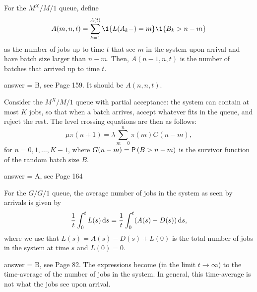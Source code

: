 \begin{exercise}[201803]
For the $M^X/M/1$ queue, define 
\begin{equation*}
  A(m,n,t) = \sum_{k=1}^{A(t)}\1{L(A_k-) = m}\1{B_k > n-m}
\end{equation*}
as the number of jobs up to time $t$ that see $m$ in the system upon
arrival and have batch size larger than $n-m$.  Then, $A(n-1, n, t)$ is the number of batches that arrived up to time $t$. 
\begin{solution}
answer = B, see Page 159. It should be $A(n, n,t)$.
\end{solution}
\end{exercise}

\begin{exercise}[201803]
Consider the $M^X/M/1$ queue with partial acceptance: the system can contain at most $K$ jobs, so that when a batch arrives,  accept whatever fits in the queue, and reject the rest.
The level crossing equations are then as follows:
  \begin{equation*}
    \mu \pi(n+1) = \lambda \sum_{m=0}^n \pi(m) G(n-m), 
  \end{equation*}
  for $n=0,1,\ldots, K-1$, where $G(n-m)=\P{B>n-m}$ is the survivor function of the random batch size $B$.
\begin{solution}
answer = A, see Page 164

\end{solution}
\end{exercise}

\begin{exercise}[201804]For the $G/G/1$ queue,  the average number of
jobs in the system as seen by arrivals is given by
\begin{equation}\label{eq:11}
\frac 1 t\int_0^t L(s)\,\text{d}s =  \frac 1 t\int_0^t (A(s)-D(s)) \,\text{d}s,
\end{equation}
where we use that $L(s)=A(s) - D(s) + L(0)$ is the total number of jobs in
the system at time $s$ and $L(0)=0$.
\begin{solution}
answer = B, see Page 82.  The expressions become (in the limit $t\to\infty$) to the time-average of the number of jobs in the system.  In general, this time-average is not what the jobs see upon arrival.
\end{solution}
\end{exercise}

